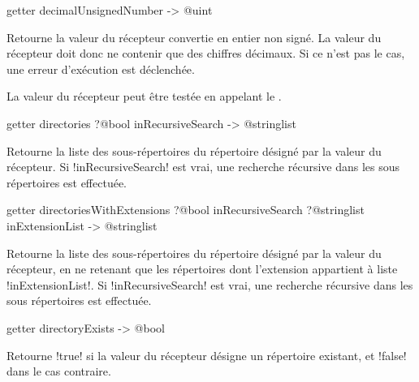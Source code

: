 
\begin{galgasbox}
getter decimalUnsignedNumber -> @uint
\end{galgasbox}

Retourne la valeur du récepteur convertie en entier non signé. La valeur du récepteur doit donc ne contenir que des chiffres décimaux. Si ce n'est pas le cas, une erreur d'exécution est déclenchée.

La valeur du récepteur peut être testée en appelant le .









\begin{galgasbox}
getter directories ?@bool inRecursiveSearch -> @stringlist
\end{galgasbox}

Retourne la liste des sous-répertoires du répertoire désigné par la valeur du récepteur. Si \ggs!inRecursiveSearch! est vrai, une recherche récursive dans les sous répertoires est effectuée.










\begin{galgasbox}
getter directoriesWithExtensions
    ?@bool inRecursiveSearch
    ?@stringlist inExtensionList -> @stringlist
\end{galgasbox}

Retourne la liste des sous-répertoires du répertoire désigné par la valeur du récepteur, en ne retenant que les répertoires dont l'extension appartient à liste \ggs!inExtensionList!. Si \ggs!inRecursiveSearch! est vrai, une recherche récursive dans les sous répertoires est effectuée.









\begin{galgasbox}
getter directoryExists -> @bool
\end{galgasbox}

Retourne \ggs!true! si la valeur du récepteur désigne un répertoire existant, et \ggs!false! dans le cas contraire.








